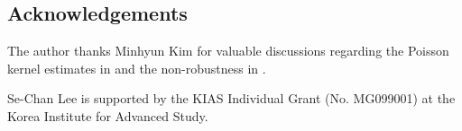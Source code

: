 \documentclass[11pt]{amsart}
\theoremstyle{plain}
\theoremstyle{definition}
\numberwithin{equation}{section}
\begin{document}
\subsection*{Acknowledgements}
The author thanks Minhyun Kim for valuable discussions regarding the Poisson kernel estimates in  and the non-robustness in .

Se-Chan Lee is supported by the KIAS Individual Grant (No. MG099001) at the Korea Institute for Advanced Study.




\end{document}

